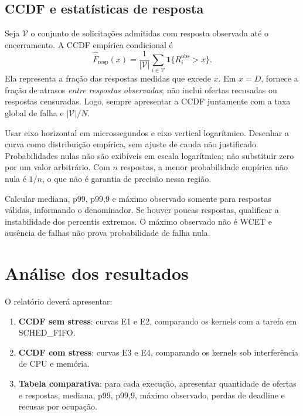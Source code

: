 \documentclass[11pt,a4paper]{article}
\begin{document}
\subsection{CCDF e estatísticas de resposta}

Seja $\mathcal{V}$ o conjunto de solicitações admitidas com resposta observada até o encerramento. A CCDF empírica condicional é
\begin{equation}
 \widehat{\overline F}_{\mathrm{resp}}(x)=
 \frac{1}{|\mathcal{V}|}\sum_{i\in\mathcal{V}}
 \mathbf{1}\{R_i^{\mathrm{obs}}>x\}.
\end{equation}
Ela representa a fração das respostas medidas que excede $x$. Em $x=D$, fornece a fração de atrasos \emph{entre respostas observadas}; não inclui ofertas recusadas ou respostas censuradas. Logo, sempre apresentar a CCDF juntamente com a taxa global de falha e $|\mathcal{V}|/N$.

Usar eixo horizontal em microssegundos e eixo vertical logarítmico. Desenhar a curva como distribuição empírica, sem ajuste de cauda não justificado. Probabilidades nulas não são exibíveis em escala logarítmica; não substituir zero por um valor arbitrário. Com $n$ respostas, a menor probabilidade empírica não nula é $1/n$, o que não é garantia de precisão nessa região.

Calcular mediana, p99, p99,9 e máximo observado somente para respostas válidas, informando o denominador. Se houver poucas respostas, qualificar a instabilidade dos percentis extremos. O máximo observado não é WCET e ausência de falhas não prova probabilidade de falha nula.

\section{Análise dos resultados}

O relatório deverá apresentar:

\begin{enumerate}
\item \textbf{CCDF sem stress}: curvas E1 e E2, comparando os kernels
com a tarefa em SCHED\_FIFO.
\item \textbf{CCDF com stress}: curvas E3 e E4, comparando os kernels
sob interferência de CPU e memória.
\item \textbf{Tabela comparativa}: para cada execução, apresentar
quantidade de ofertas e respostas, mediana, p99, p99,9, máximo
observado, perdas de deadline e recusas por ocupação.
\end{enumerate}
\end{document}
